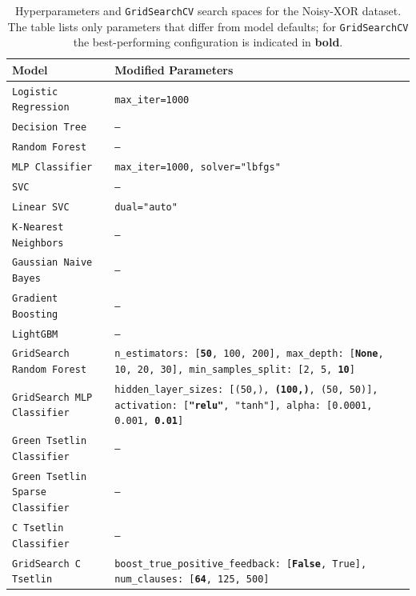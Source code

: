 \documentclass[english]{aghengthesis} %
\begin{document}
\begin{table}[!htbp]
\centering
\caption[Noisy-XOR Hyperparameters]{Hyperparameters and \texttt{GridSearchCV} search spaces for the Noisy-XOR dataset. The table lists only parameters that differ from model defaults; for \texttt{GridSearchCV} the best-performing configuration is indicated in \textbf{bold}.}
\begin{tabularx}{\columnwidth}{@{}l L@{}} \toprule
    \textbf{Model} & \textbf{Modified Parameters} \\ \midrule \midrule
    \texttt{Logistic Regression} & \texttt{max\_iter=1000} \\ \midrule
    \texttt{Decision Tree} & \texttt{---} \\ \midrule
    \texttt{Random Forest} & \texttt{---} \\ \midrule
    \texttt{MLP Classifier} & \texttt{max\_iter=1000, solver="lbfgs"} \\ \midrule
    \texttt{SVC} & \texttt{---} \\ \midrule
    \texttt{Linear SVC} & \texttt{dual="auto"} \\ \midrule
    \texttt{K-Nearest Neighbors} & \texttt{---} \\ \midrule
    \texttt{Gaussian Naive Bayes} & \texttt{---} \\ \midrule
    \texttt{Gradient Boosting} & \texttt{---} \\ \midrule
    \texttt{LightGBM} & \texttt{---} \\ \midrule
    \texttt{GridSearch Random Forest} & \texttt{n\_estimators: [\textbf{50}, 100, 200], max\_depth: [\textbf{None}, 10, 20, 30], min\_samples\_split: [2, 5, \textbf{10}]} \\ \midrule
    \texttt{GridSearch MLP Classifier} & \texttt{hidden\_layer\_sizes: [(50,), \textbf{(100,)}, (50, 50)], activation: [\textbf{"relu"}, "tanh"], alpha: [0.0001, 0.001, \textbf{0.01}]} \\ \midrule \midrule
    \texttt{Green Tsetlin Classifier} & \texttt{---} \\ \midrule
    \texttt{Green Tsetlin Sparse Classifier} & \texttt{---} \\ \midrule
    \texttt{C Tsetlin Classifier} & \texttt{---} \\ \midrule
    \texttt{GridSearch C Tsetlin} & \texttt{boost\_true\_positive\_feedback: [\textbf{False}, True], num\_clauses: [\textbf{64}, 125, 500]} \\ \bottomrule
\end{tabularx}
\label{tab:noisy-xor-params}
\end{table}
\end{document}

